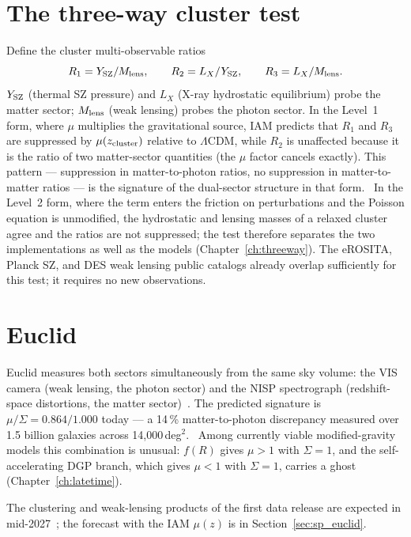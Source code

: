 \section{The three-way cluster test}\label{sec:vt_cluster}
Define the cluster multi-observable ratios
\begin{equation}
R_1=Y_{\rm SZ}/M_{\rm lens},\qquad R_2=L_X/Y_{\rm SZ},\qquad R_3=L_X/M_{\rm lens}.\label{eq:vt_R}
\end{equation}
$Y_{\rm SZ}$ (thermal SZ pressure) and $L_X$ (X-ray hydrostatic equilibrium) probe the matter sector; $M_{\rm lens}$ (weak lensing) probes the photon sector. In
the Level~1 form, where $\mu$ multiplies the gravitational source, IAM predicts that $R_1$ and $R_3$ are suppressed by $\mu(z_{\rm cluster})$ relative to
$\Lambda$CDM, while $R_2$ is unaffected because it is the ratio of two matter-sector quantities (the $\mu$ factor cancels exactly). This pattern ---
suppression in matter-to-photon ratios, no suppression in matter-to-matter ratios --- is the signature of the dual-sector structure in that form.
\prediction\ In the Level~2 form, where the term enters the friction on perturbations and the Poisson equation is unmodified, the hydrostatic and lensing
masses of a relaxed cluster agree and the ratios are not suppressed; the test therefore separates the two implementations as well as the models
(Chapter~\ref{ch:threeway}). The eROSITA, Planck SZ, and DES weak lensing public catalogs already overlap sufficiently for this test; it requires no new
observations. \openprob

\section{Euclid}\label{sec:vt_euclid}
Euclid measures both sectors simultaneously from the same sky volume: the VIS camera (weak lensing, the photon sector) and the NISP spectrograph
(redshift-space distortions, the matter sector)~\cite{Euclid2025}. The predicted signature is $\mu/\Sigma=0.864/1.000$ today --- a 14\,\% matter-to-photon
discrepancy measured over 1.5 billion galaxies across 14,000\,deg$^2$. \prediction\ Among currently viable modified-gravity models this combination is
unusual: $f(R)$ gives $\mu>1$ with $\Sigma=1$, and the self-accelerating DGP branch, which gives $\mu<1$ with $\Sigma=1$, carries a ghost
(Chapter~\ref{ch:latetime}).

The clustering and weak-lensing products of the first data release are expected in mid-2027~\cite{ESA2026DR1}; the forecast with the IAM $\mu(z)$ is in Section~\ref{sec:sp_euclid}.

